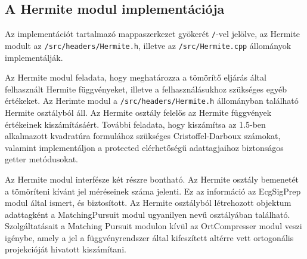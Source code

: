 \documentclass[oneside,titlepage,12pt,a4paper]{report}
\begin{document}
\subsection{A Hermite modul implementációja}

Az implementációt tartalmazó mappaszerkezet gyökerét \texttt{/}-vel jelölve, az Hermite modult  az \texttt{/src/headers/Hermite.h}, illetve az \texttt{/src/Hermite.cpp} állományok implementálják.
\par Az Hermite modul feladata, hogy meghatározza a tömörítő eljárás által felhasznált Hermite függvényeket, illetve a felhasználásukhoz szükséges egyéb értékeket. Az Herimte modul a \texttt{/src/headers/Hermite.h} állományban található Hermite osztályból áll. Az Hermite osztály felelős az Hermite függvények értékeinek kiszámításáért. További feladata, hogy kiszámítsa az 1.5-ben alkalmazott kvadratúra formulához szükséges Cristoffel-Darboux számokat, valamint implementáljon a protected elérhetőségű adattagjaihoz biztonságos getter metódusokat.
\par Az Hermite modul interfésze két részre bontható. Az Hermite osztály bemenetét a tömöríteni kívánt jel méréseinek száma jelenti. Ez az információ az EcgSigPrep modul által ismert, és biztosított. Az Hermite osztályból létrehozott objektum adattagként a MatchingPursuit modul ugyanilyen nevű osztályában található. Szolgáltatásait a Matching Pursuit modulon kívül az OrtCompresser modul veszi igénybe, amely a jel a függvényrendszer által kifeszített altérre vett ortogonális projekcióját hivatott kiszámítani. 
\end{document}
